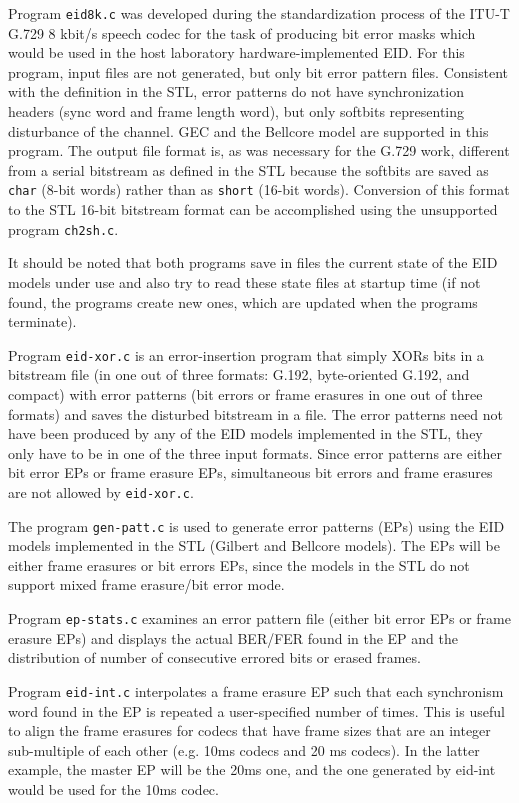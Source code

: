 Program {\tt eid8k.c} was developed during the standardization process of
the ITU-T G.729 8 kbit/s speech codec for the task of producing bit
error masks which would be used in the host laboratory
hardware-implemented EID. For this program, input files are not
generated, but only bit error pattern files. Consistent with the
definition in the STL, error patterns do not have synchronization
headers (sync word and frame length word), but only softbits
representing disturbance of the channel. GEC and the Bellcore model
are supported in this program. The output file format is, as was
necessary for the G.729 work, different from a serial bitstream as
defined in the STL because the softbits are saved as {\tt char} (8-bit
words) rather than as {\tt short} (16-bit words). Conversion of this format
to the STL 16-bit bitstream format can be accomplished using the
unsupported program {\tt ch2sh.c}.

It should be noted that both programs save in files the current
state of the EID models under use and also try to read
these state files at startup time (if not found, the programs create
new ones, which are updated when the programs terminate).

Program {\tt eid-xor.c} is an error-insertion program that simply XORs
bits in a bitstream file (in one out of three formats: G.192,
byte-oriented G.192, and compact) with error patterns (bit errors or
frame erasures in one out of three formats) and saves the disturbed
bitstream in a file. The error patterns need not have been produced by
any of the EID models implemented in the STL, they only have to be in
one of the three input formats. Since error patterns are either bit
error EPs or frame erasure EPs, simultaneous bit errors and frame
erasures are not allowed by {\tt eid-xor.c}.

The program {\tt gen-patt.c} is used to generate error patterns (EPs) using
the EID models implemented in the STL (Gilbert and Bellcore
models). The EPs will be either frame erasures or bit errors EPs,
since the models in the STL do not support mixed frame erasure/bit
error mode.

Program {\tt ep-stats.c} examines an error pattern file (either bit
error EPs or frame erasure EPs) and displays the actual BER/FER found
in the EP and the distribution of number of consecutive errored bits
or erased frames.

Program {\tt eid-int.c} interpolates a frame erasure EP such that each
synchronism word found in the EP is repeated a user-specified number
of times. This is useful to align the frame erasures for codecs that
have frame sizes that are an integer sub-multiple of each other
(e.g. 10ms codecs and 20 ms codecs). In the latter example, the master
EP will be the 20ms one, and the one generated by eid-int would be
used for the 10ms codec.

